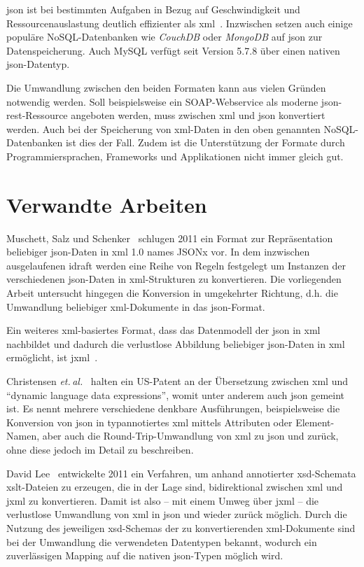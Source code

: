 \acrshort{json} ist bei bestimmten Aufgaben in Bezug auf Geschwindigkeit und
Ressourcenauslastung deutlich effizienter als \acrshort{xml}~\cite{nurseitov2009comparison}\@.
Inzwischen setzen auch einige populäre NoSQL-Datenbanken wie
\emph{CouchDB} oder \emph{MongoDB} auf \acrshort{json} zur Datenspeicherung. Auch
MySQL verfügt seit Version 5.7.8 über einen nativen \acrshort{json}-Datentyp.

Die Umwandlung zwischen den beiden Formaten kann aus vielen Gründen
notwendig werden. Soll beispielsweise ein SOAP-Webservice als moderne
\acrshort{json}-\acrshort{rest}-Ressource angeboten werden, muss zwischen \acrshort{xml} und \acrshort{json} konvertiert
werden. Auch bei der Speicherung von \acrshort{xml}-Daten in den oben genannten NoSQL-Datenbanken
ist dies der Fall. Zudem ist die Unterstützung der Formate durch
Programmiersprachen, Frameworks und Applikationen nicht immer gleich gut.

\section{Verwandte Arbeiten}

Muschett, Salz und Schenker~\cite{jsonx} schlugen 2011 ein Format zur Repräsentation beliebiger \acrshort{json}-Daten in \acrshort{xml} 1.0 names JSONx vor. In dem inzwischen ausgelaufenen \gls{idraft} werden eine Reihe von Regeln festgelegt um Instanzen der verschiedenen \acrshort{json}-Daten in \acrshort{xml}-Strukturen zu konvertieren. Die vorliegenden Arbeit untersucht hingegen die Konversion in umgekehrter Richtung, d.h. die Umwandlung beliebiger \acrshort{xml}-Dokumente in das \acrshort{json}-Format.

Ein weiteres \acrshort{xml}-basiertes Format, dass das Datenmodell der \acrfull{json} in \acrshort{xml} nachbildet und dadurch die verlustlose Abbildung beliebiger \acrshort{json}-Daten in \acrshort{xml} ermöglicht, ist \gls{jxml}~\cite{jxml}.

Christensen \emph{et.\,al.}~\cite{US7761484} halten ein US-Patent an der Übersetzung zwischen \acrshort{xml} und \enquote{dynamic language data expressions}, womit unter anderem auch \acrshort{json} gemeint ist. Es nennt mehrere verschiedene denkbare Ausführungen, beispielsweise die Konversion von \acrshort{json} in typannotiertes \acrshort{xml} mittels Attributen oder Element-Namen, aber auch die Round-Trip-Umwandlung von \acrshort{xml} zu \acrshort{json} und zurück, ohne diese jedoch im Detail zu beschreiben.

David Lee~\cite{lee2011jxon} entwickelte 2011 ein Verfahren, um anhand annotierter \acrshort{xsd}-Schemata \acrshort{xslt}-Dateien zu erzeugen, die in der Lage sind, bidirektional zwischen \acrshort{xml} und \gls{jxml} zu konvertieren.  Damit ist also -- mit einem Umweg über \gls{jxml} -- die verlustlose Umwandlung von \acrshort{xml} in \acrshort{json} und wieder zurück möglich.
Durch die Nutzung des jeweiligen \acrshort{xsd}-Schemas der zu konvertierenden \acrshort{xml}-Dokumente sind bei der Umwandlung die verwendeten Datentypen bekannt, wodurch ein zuverlässigen Mapping auf die nativen \acrshort{json}-Typen möglich wird.

